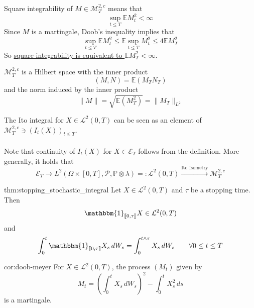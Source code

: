\documentclass[12pt,a4paper]{article}
\newcommand{\E}{\mathbb{E}}
\begin{document}
\begin{remark}{}{}
    Square integrability of $M\in\mathcal{M}^{2,c}_T$ means that
    $$
    \sup_{t\le T}\E M_t^2<\infty
    $$
    Since $M$ is a martingale, Doob's inequality implies that
    $$
    \sup_{t\le T}\E M_t^2 \le \E\sup_{t\le T}M_t^2 \le 4\E M_T^2
    $$
    So \underline{square integrability is equivalent to $\E M_T^2<\infty$}.
\end{remark}
\begin{theorem}{}{}
    $\mathcal{M}^{2,c}_T$ is a Hilbert space with the inner product 
    $$
    (M,N) = \E(M_TN_T)
    $$
    and the norm induced by the inner product
    $$
    \|M\| = \sqrt{\E(M_T^2)} = \|M_T\|_{L^2}
    $$
\end{theorem}
\begin{remark}{}{}
    The Ito integral for $X\in\mathcal{L}^2(0,T)$ can be seen as an element of $\mathcal{M}^{2,c}_T\ni (I_t(X))_{t\le T}$.\\
    \\
    Note that continuity of $I_t(X)$ for $X\in\mathcal{E}_T$ follows from the definition. More generally, it holds that
    $$
    \mathcal{E}_T\to L^2(\Omega\times[0,T], \mathscr{P}, \mathbb{P}\otimes\lambda)=:\mathcal{L}^2(0,T) \xrightarrow{\text{Ito Isometry}} \mathcal{M}^{2,c}_T
    $$
\end{remark}
\pagebreak
\begin{theorem}{}{thm:stopping_stochastic_integral}
    Let $X\in \mathcal{L}^2(0,T)$ and $\tau$ be a stopping time. Then
    $$
    \mathbbm{1}_{\llbracket 0,\tau \rrbracket} X\in\mathcal{L}^2(0,T)
    $$
    and
    $$
    \int_0^t \mathbbm{1}_{\llbracket 0,\tau \rrbracket} X_s \,dW_s = \int_0^{t\wedge \tau} X_s\,dW_s\qquad\forall 0\le t\le T
    $$
\end{theorem}
\pagebreak
\begin{corollary}{}{cor:doob-meyer}
    For $X\in\mathcal{L}^2(0,T)$, the process $(M_t)$ given by
    $$
    \boxed{M_t = \left(\int_0^t X_s\, dW_s\right)^2 - \int_0^t X_s^2\, ds}
    $$
    is a martingale.
\end{corollary}
\end{document}
